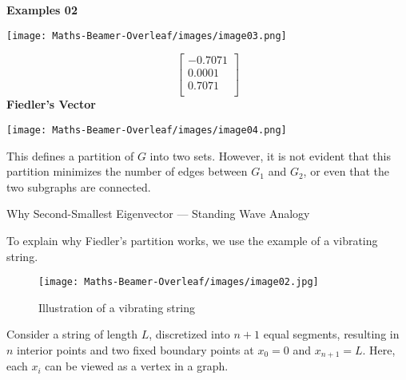 \documentclass[aspectratio=169]{beamer}
\begin{document}
\begin{frame}
\textbf{Examples 02}\\
\noindent
\begin{minipage}[c]{0.4\textwidth}
    \centering
    \texttt{[image: Maths-Beamer-Overleaf/images/image03.png]}
\end{minipage}%
\begin{minipage}[c]{0.2\textwidth}
    \centering
    \[
    \begin{bmatrix}
    -0.7071 \\
    0.0001 \\
    0.7071 \\
    \end{bmatrix}
    \]
    \textbf{Fiedler's Vector}
\end{minipage}%
\hfill
\begin{minipage}[c]{0.4\textwidth}
    \centering
    \texttt{[image: Maths-Beamer-Overleaf/images/image04.png]}
\end{minipage}

This defines a partition of \( G \) into two sets. However, it is not evident that this partition minimizes the number of edges between \( G_1 \) and \( G_2 \), or even that the two subgraphs are connected.
\end{frame}
\begin{frame}{Why Second-Smallest Eigenvector — Standing Wave Analogy}

To explain why Fiedler's partition works, we use the example of a vibrating string.

\begin{figure}
    \centering
    \texttt{[image: Maths-Beamer-Overleaf/images/image02.jpg]}
    \caption{Illustration of a vibrating string}
\end{figure}

Consider a string of length \( L \), discretized into \( n+1 \) equal segments, resulting in \( n \) interior points and two fixed boundary points at \( x_0 = 0 \) and \( x_{n+1} = L \). Here, each \( x_i \) can be viewed as a vertex in a graph.
\end{frame}
\end{document}
